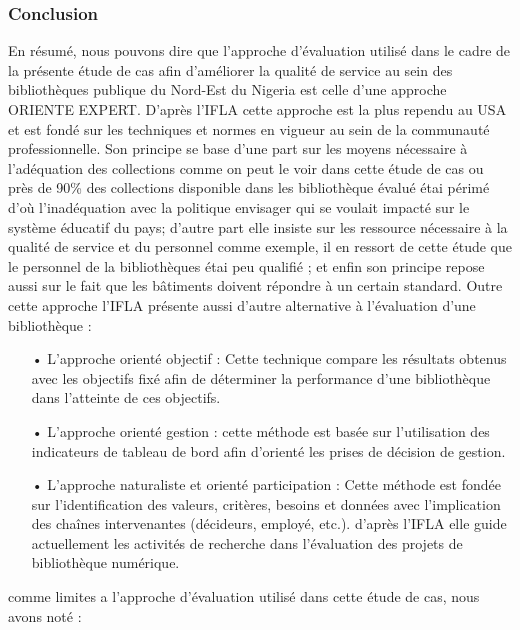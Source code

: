 \documentclass[french,a4paper,12pt]{article}
\begin{document}
\subsubsection{Conclusion}
\quad En résumé, nous pouvons dire que l'approche d'évaluation utilisé dans le cadre de la présente étude de cas afin d'améliorer la qualité de service au sein des bibliothèques publique du Nord-Est du Nigeria est celle d'une approche ORIENTE EXPERT. D'après l'IFLA cette approche est la plus rependu au USA et est fondé sur les techniques et normes en vigueur au sein de la communauté professionnelle. Son principe se base d'une part sur les moyens nécessaire à l'adéquation des collections comme on peut le voir dans cette étude de cas ou près de 90\% des collections disponible dans les bibliothèque évalué étai périmé d'où l'inadéquation avec la politique envisager qui se voulait impacté sur le système éducatif du pays; d'autre part elle insiste sur les ressource nécessaire à la qualité de service et du personnel comme exemple, il en ressort de cette étude que le personnel de la bibliothèques étai peu qualifié ; et enfin son principe repose aussi sur le fait que les bâtiments doivent répondre à un certain standard. Outre cette approche l’IFLA présente aussi d'autre alternative à l'évaluation d'une bibliothèque\citep{noauthor_mesures_nodate} : 
\begin{enumerate}

\item[•]L'approche orienté objectif : 
Cette technique compare les résultats obtenus avec les objectifs fixé afin de déterminer la performance d'une bibliothèque dans l'atteinte de ces objectifs.

\item[•]L'approche orienté gestion : 
cette méthode est basée sur l'utilisation des indicateurs de tableau de bord afin d'orienté les prises de décision de gestion.  
\item[•]L'approche naturaliste et orienté participation :
Cette méthode est fondée sur l'identification des valeurs, critères, besoins et données avec l’implication des chaînes intervenantes (décideurs, employé, etc.). d'après l'IFLA elle guide actuellement les activités de recherche dans l'évaluation des projets de bibliothèque numérique. \\
\end{enumerate}
\quad comme limites a l'approche d'évaluation utilisé dans cette étude de cas, nous avons noté : 
\end{document}
